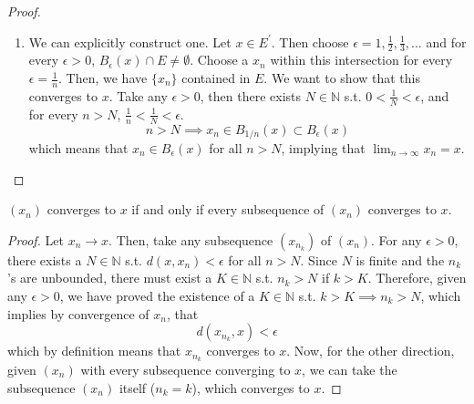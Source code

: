 \begin{proof}
\begin{enumerate}
      \item We can explicitly construct one. Let $x \in E^\prime$. Then choose $\epsilon = 1, \frac{1}{2}, \frac{1}{3}, \ldots$ and for every $\epsilon > 0$, $B_\epsilon (x) \cap E \neq \emptyset$. Choose a $x_n$ within this intersection for every $\epsilon = \frac{1}{n}$. Then, we have $\{x_n\}$ contained in $E$. We want to show that this converges to $x$. Take any $\epsilon > 0$, then there exists $N \in \mathbb{N}$ s.t. $0 < \frac{1}{N} < \epsilon$, and for every $n > N$, $\frac{1}{n} < \frac{1}{N} < \epsilon$.
      \begin{equation}
        n > N \implies x_n \in B_{1/n} (x) \subset B_\epsilon (x)
      \end{equation}
      which means that $x_n \in B_\epsilon (x)$ for all $n > N$, implying that $\lim_{n \rightarrow \infty} x_n = x$. 
    \end{enumerate}
  \end{proof}

  \begin{lemma}
    $(x_n)$ converges to $x$ if and only if every subsequence of $(x_n)$ converges to $x$. 
  \end{lemma}
  \begin{proof}
    Let $x_n \rightarrow x$. Then, take any subsequence $(x_{n_k})$ of $(x_n)$. For any $\epsilon > 0$, there exists a $N \in \mathbb{N}$ s.t. $d(x, x_n) < \epsilon$ for all $n > N$. Since $N$ is finite and the $n_k$'s are unbounded, there must exist a $K \in \mathbb{N}$ s.t. $n_k > N$ if $k > K$. Therefore, given any $\epsilon > 0$, we have proved the existence of a $K \in \mathbb{N}$ s.t. $k > K \implies n_k > N$, which implies by convergence of $x_n$, that 
    \begin{equation}
      d(x_{n_k}, x) < \epsilon
    \end{equation}
    which by definition means that $x_{n_k}$ converges to $x$. Now, for the other direction, given $(x_n)$ with every subsequence converging to $x$, we can take the subsequence $(x_n)$ itself ($n_k = k$), which converges to $x$. 
  \end{proof}

